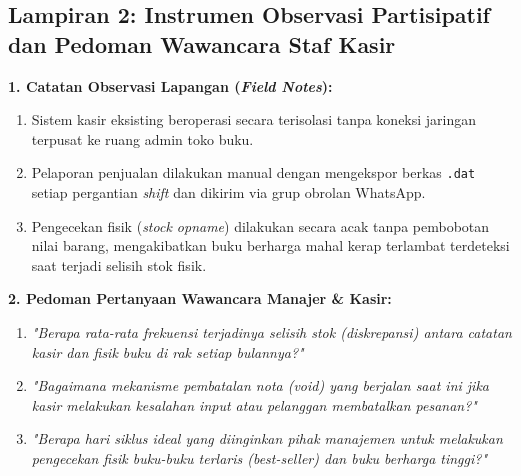 \documentclass[11pt, a4paper]{article}
\begin{document}
\vspace{0.6cm}
\subsection*{Lampiran 2: Instrumen Observasi Partisipatif dan Pedoman Wawancara Staf Kasir}

\noindent
\textbf{1. Catatan Observasi Lapangan (\textit{Field Notes}):}
\begin{enumerate}[label=\alph*.]
    \item Sistem kasir eksisting beroperasi secara terisolasi tanpa koneksi jaringan terpusat ke ruang admin toko buku.
    \item Pelaporan penjualan dilakukan manual dengan mengekspor berkas \texttt{.dat} setiap pergantian \textit{shift} dan dikirim via grup obrolan WhatsApp.
    \item Pengecekan fisik (\textit{stock opname}) dilakukan secara acak tanpa pembobotan nilai barang, mengakibatkan buku berharga mahal kerap terlambat terdeteksi saat terjadi selisih stok fisik.
\end{enumerate}

\vspace{0.4cm}
\noindent
\textbf{2. Pedoman Pertanyaan Wawancara Manajer \& Kasir:}
\begin{enumerate}[label=\alph*.]
    \item \textit{"Berapa rata-rata frekuensi terjadinya selisih stok (diskrepansi) antara catatan kasir dan fisik buku di rak setiap bulannya?"}
    \item \textit{"Bagaimana mekanisme pembatalan nota (void) yang berjalan saat ini jika kasir melakukan kesalahan input atau pelanggan membatalkan pesanan?"}
    \item \textit{"Berapa hari siklus ideal yang diinginkan pihak manajemen untuk melakukan pengecekan fisik buku-buku terlaris (best-seller) dan buku berharga tinggi?"}
\end{enumerate}
\end{document}
